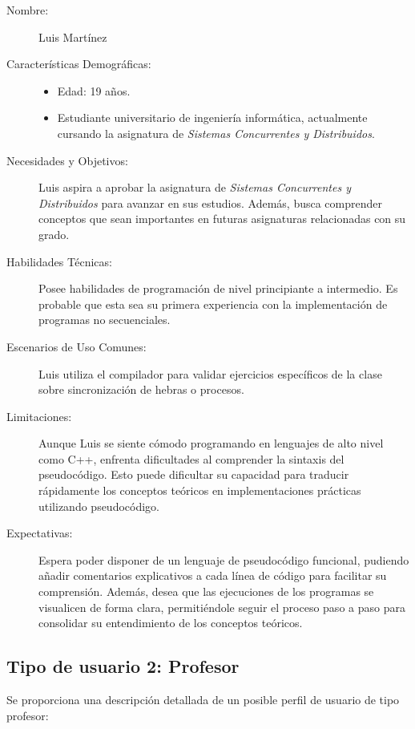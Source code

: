 \begin{description}
    \item[Nombre:] Luis Martínez
    \item[Características Demográficas:] \hfill
        \begin{itemize}
            \item Edad: 19 años.
            \item Estudiante universitario de ingeniería informática, actualmente cursando la asignatura de \textit{Sistemas Concurrentes y Distribuidos}.
        \end{itemize}
    \item[Necesidades y Objetivos:] Luis aspira a aprobar la asignatura de \textit{Sistemas Concurrentes y Distribuidos} para avanzar en sus estudios. Además, busca comprender conceptos que sean importantes en futuras asignaturas relacionadas con su grado.
    
    \item[Habilidades Técnicas:] Posee habilidades de programación de nivel principiante a intermedio. Es probable que esta sea su primera experiencia con la implementación de programas no secuenciales.
    
    \item[Escenarios de Uso Comunes:] Luis utiliza el compilador para validar ejercicios específicos de la clase sobre sincronización de hebras o procesos.
    
    \item[Limitaciones:] Aunque Luis se siente cómodo programando en lenguajes de alto nivel como C++, enfrenta dificultades al comprender la sintaxis del pseudocódigo. Esto puede dificultar su capacidad para traducir rápidamente los conceptos teóricos en implementaciones prácticas utilizando pseudocódigo.
    
    \item[Expectativas:] Espera poder disponer de un lenguaje de pseudocódigo funcional, pudiendo añadir comentarios explicativos a cada línea de código para facilitar su comprensión. Además, desea que las ejecuciones de los programas se visualicen de forma clara, permitiéndole seguir el proceso paso a paso para consolidar su entendimiento de los conceptos teóricos.
\end{description}

\subsection{Tipo de usuario 2: Profesor}
Se proporciona una descripción detallada de un posible perfil de usuario de tipo profesor:

